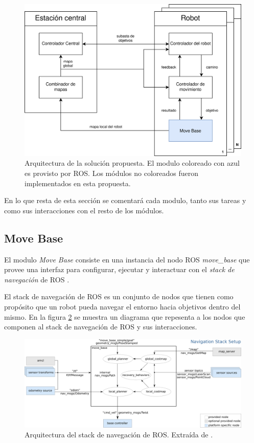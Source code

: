 \begin{figure}[H]
  \center
  \includegraphics[width=1\linewidth]{imagenes/arquitectura.png}
  \caption[Arquitectura de la solucion propuesta.]{Arquitectura de la solución propuesta. El modulo coloreado con azul es provisto por ROS. Los módulos no coloreados fueron  implementados en esta propuesta.}
  \label{fig:arquitectura}
\end{figure} 

En lo que resta de esta sección se comentará cada modulo, tanto sus tareas y como sus interacciones con el resto de los módulos.

\subsection{Move Base}\label{subsec:move_base}
El modulo \emph{Move Base} consiste en una instancia del nodo ROS
\emph{move\_base} \cite{ROS-move_base} que provee una interfaz para configurar,
ejecutar y interactuar con el \emph{stack de navegación} de ROS
\cite{ROS-navigation}. 

El stack de navegación de ROS es un conjunto de nodos que tienen como propósito
que un robot pueda navegar el entorno hacia objetivos dentro del mismo. En la
figura \ref{fig:move_base} se muestra un diagrama que repesenta a los nodos que
componen al stack de navegación de ROS y sus interacciones.

\begin{figure}[H]
  \center
  \includegraphics[width=1\linewidth]{imagenes/move_base.png}
  \caption[Arquitectura del stack de navegación de ROS.]{Arquitectura del stack de navegación de ROS. Extraída de \cite{ROS-move_base}.}
  \label{fig:move_base}
\end{figure} 

